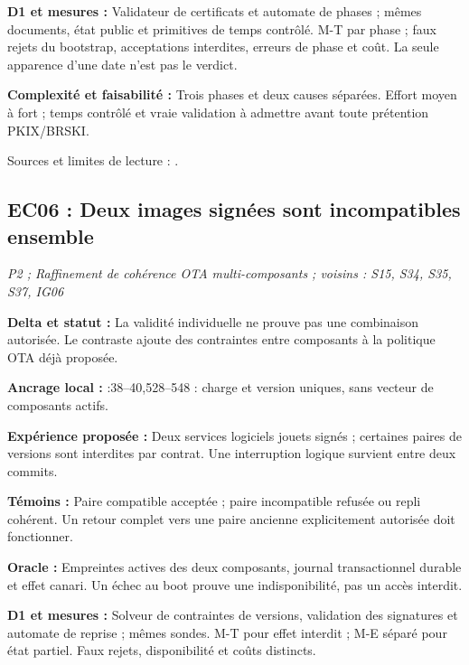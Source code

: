 \documentclass[11pt,a4paper]{article}
\newcommand{\code}[1]{{\small\ttfamily\path{#1}}}
\begin{document}
\textbf{D1 et mesures :} Validateur de certificats et automate de phases ; mêmes documents, état public et primitives de temps contrôlé. M-T par phase ; faux rejets du bootstrap, acceptations interdites, erreurs de phase et coût. La seule apparence d'une date n'est pas le verdict.

\textbf{Complexité et faisabilité :} Trois phases et deux causes séparées. Effort moyen à fort ; temps contrôlé et vraie validation à admettre avant toute prétention PKIX/BRSKI.

Sources et limites de lecture : \cite{brski}.

\par\noindent\begin{minipage}{\linewidth}\setlength{\parskip}{5pt}\subsection{EC06 : Deux images signées sont incompatibles ensemble}

\textit{P2 ; Raffinement de cohérence OTA multi-composants ; voisins : S15, S34, S35, S37, IG06}

\textbf{Delta et statut :} La validité individuelle ne prouve pas une combinaison autorisée. Le contraste ajoute des contraintes entre composants à la politique OTA déjà proposée.\par\end{minipage}\par

{\small\textbf{Ancrage local :} \code{benchmark_simulator.py}:38--40,528--548 : charge et version uniques, sans vecteur de composants actifs.}

\textbf{Expérience proposée :} Deux services logiciels jouets signés ; certaines paires de versions sont interdites par contrat. Une interruption logique survient entre deux commits.

\textbf{Témoins :} Paire compatible acceptée ; paire incompatible refusée ou repli cohérent. Un retour complet vers une paire ancienne explicitement autorisée doit fonctionner.

\textbf{Oracle :} Empreintes actives des deux composants, journal transactionnel durable et effet canari. Un échec au boot prouve une indisponibilité, pas un accès interdit.

\textbf{D1 et mesures :} Solveur de contraintes de versions, validation des signatures et automate de reprise ; mêmes sondes. M-T pour effet interdit ; M-E séparé pour état partiel. Faux rejets, disponibilité et coûts distincts.
\end{document}
